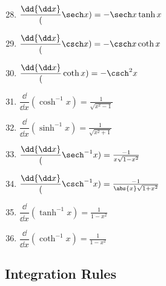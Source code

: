 \parbox{.24\linewidth}{%
\begin{enumerate}\setcounter{enumi}{27}
\item $\dfrac\dd{\dd x}(\sech x)=-\sech x\tanh x$
\item $\dfrac\dd{\dd x}(\csch x)=-\csch x\coth x$
\item $\dfrac\dd{\dd x}(\coth x)=-\csch^2 x$
\item $\dfrac\dd{\dd x}(\cosh^{-1}x)=\frac1{\sqrt{x^2-1}}$
\item $\dfrac\dd{\dd x}(\sinh^{-1}x)=\frac1{\sqrt{x^2+1}}$
\item $\dfrac\dd{\dd x}(\sech^{-1}x)=\frac{-1}{x\sqrt{1-x^2}}$
\item $\dfrac\dd{\dd x}(\csch^{-1}x)=\frac{-1}{\abs{x}\sqrt{1+x^2}}$
\item $\dfrac\dd{\dd x}(\tanh^{-1}x)=\frac1{1-x^2}$
\item $\dfrac\dd{\dd x}(\coth^{-1}x)=\frac1{1-x^2}$
\end{enumerate}}

\vspace{4\baselineskip}

\subsection{Integration Rules}

